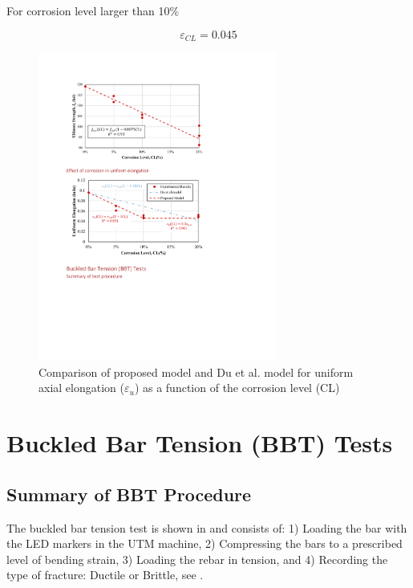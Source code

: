 For corrosion level larger than 10\%

\begin{equation}
    \varepsilon_{CL} = 0.045
    \label{eq.Calderon_UAE_vs_CL20}
\end{equation}

\begin{figure}[htbp]
	\centering
	\includegraphics[width=0.7\textwidth]{VAC Thesis 2.0/Chapter-4/figs/TensionTest_results_4_proposedmodel.pdf}
	\caption{Comparison of proposed model and Du et al. model \cite{Du2005} for uniform axial elongation ($\varepsilon_u$) as a function of the corrosion level (CL)}
	\label{fig:UAE_vs_CL}
\end{figure}

\section{Buckled Bar Tension (BBT) Tests}
\subsection{Summary of BBT Procedure}

The buckled bar tension test is shown in  and consists of: 1) Loading the bar with the LED markers in the UTM machine, 2) Compressing the bars to a prescribed level of bending strain, 3) Loading the rebar in tension, and  4) Recording the type of fracture: Ductile or Brittle, see . 

